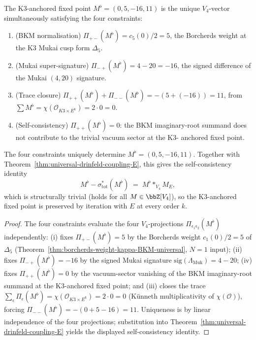 \begin{corollary}
\label{cor:M-flat-as-cartan-eigenvector}
The K$3$-anchored fixed point $M^\flat = (0, 5, -16, 11)$ is the unique
$V_4$-vector simultaneously satisfying the four constraints:
\begin{enumerate}[label=\textup{(\roman*)}]
 \item \textup{(BKM normalisation)} $\Pi_{+-}(M^\flat) = c_5(0)/2 = 5$, the
 Borcherds weight at the K$3$ Mukai cusp form $\Delta_5$.
 \item \textup{(Mukai super-signature)} $\Pi_{-+}(M^\flat) = 4 - 20 = -16$,
 the signed difference of the Mukai $(4, 20)$ signature.
 \item \textup{(Trace closure)} $\Pi_{++}(M^\flat) + \Pi_{--}(M^\flat) = -(5 + (-16)) = 11$,
 from $\sum M^\flat = \chi(\mathcal{O}_{K3 \times E^k}) = 2 \cdot 0 = 0$.
 \item \textup{(Self-consistency)} $\Pi_{++}(M^\flat) = 0$: the BKM imaginary-root
 summand does not contribute to the trivial vacuum sector at the K$3$-
 anchored fixed point.
\end{enumerate}
The four constraints uniquely determine $M^\flat = (0, 5, -16, 11)$. Together
with Theorem~\ref{thm:universal-drinfeld-coupling-E}, this gives the
self-consistency identity
\[
 M^\flat - \sigma_{\mathrm{tot}}^*(M^\flat) \;=\; M^\flat *_{V_4} M_E,
\]
which is structurally trivial \textup{(}holds for all $M \in \bbZ[V_4]$\textup{)},
so the K$3$-anchored fixed point is preserved by iteration with $E$ at every
order $k$.
\end{corollary}

\begin{proof}
The four constraints evaluate the four $V_4$-projections
$\Pi_{\epsilon_1 \epsilon_2}(M^\flat)$ independently:
(i) fixes $\Pi_{+-}(M^\flat) = 5$ by the Borcherds weight
$c_1(0)/2 = 5$ of $\Delta_5$ (Theorem~\ref{thm:borcherds-weight-kappa-BKM-universal}, $N = 1$ input);
(ii) fixes $\Pi_{-+}(M^\flat) = -16$ by the signed Mukai signature
$\mathrm{sig}(\Lambda_{\mathrm{Muk}}) = 4 - 20$; (iv) fixes
$\Pi_{++}(M^\flat) = 0$ by the vacuum-sector vanishing of the BKM
imaginary-root summand at the K$3$-anchored fixed point; and (iii)
closes the trace $\sum_\epsilon \Pi_{\epsilon}(M^\flat) =
\chi(\mathcal{O}_{K3 \times E^k}) = 2 \cdot 0 = 0$
\textup{(}Künneth multiplicativity of $\chi(\mathcal{O})$\textup{),}
forcing $\Pi_{--}(M^\flat) = -(0 + 5 - 16) = 11$. Uniqueness is by
linear independence of the four projections; substitution into
Theorem~\ref{thm:universal-drinfeld-coupling-E} yields the displayed
self-consistency identity.
\end{proof}

